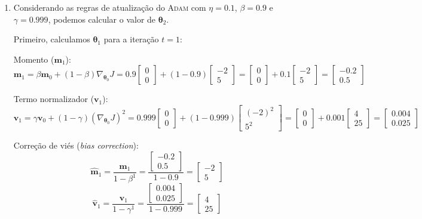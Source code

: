 \documentclass{dlproblemset}
\begin{document}
\begin{enumerate}[1)]
\begin{enumerate}
        \item {}
        Considerando as regras de atualização do \textsc{Adam} com $\eta = 0.1$, $\beta = 0.9$ e $\gamma = 0.999$, podemos calcular o valor de $\boldsymbol{\theta}_{2}$.

Primeiro, calculamos $\boldsymbol{\theta}_{1}$ para a iteração $t=1$:

  Momento ($\mathbf{m}_1$):
    $$\mathbf{m}_{1} = \beta \mathbf{m}_{0} + (1-\beta )\nabla_{\boldsymbol{\theta}_{0}}J = 0.9\begin{bmatrix} 0\\ 0 \end{bmatrix} + (1-0.9)\begin{bmatrix} -2\\ 5 \end{bmatrix} = \begin{bmatrix} 0\\ 0 \end{bmatrix} + 0.1\begin{bmatrix} -2\\ 5 \end{bmatrix} = \begin{bmatrix} -0.2\\ 0.5 \end{bmatrix}$$

  Termo normalizador ($\mathbf{v}_1$):
    $$\mathbf{v}_{1} = \gamma \mathbf{v}_{0} + (1-\gamma )(\nabla_{\boldsymbol{\theta}_{0}}J)^2 = 0.999\begin{bmatrix} 0\\ 0 \end{bmatrix} + (1-0.999)\begin{bmatrix} (-2)^2\\ 5^2 \end{bmatrix} = \begin{bmatrix} 0\\ 0 \end{bmatrix} + 0.001\begin{bmatrix} 4\\ 25 \end{bmatrix} = \begin{bmatrix} 0.004\\ 0.025 \end{bmatrix}$$

  Correção de viés (\textit{bias correction}):
    $$\hat{\mathbf{m}}_{1} = \frac{\mathbf{m}_{1}}{1 - \beta ^{1}} = \frac{\begin{bmatrix} -0.2\\ 0.5 \end{bmatrix}}{1 - 0.9} = \begin{bmatrix} -2\\ 5 \end{bmatrix}$$   $$\hat{\mathbf{v}}_{1} = \frac{\mathbf{v}_{1}}{1 - \gamma ^{1}} = \frac{\begin{bmatrix} 0.004\\ 0.025 \end{bmatrix}}{1 - 0.999} = \begin{bmatrix} 4\\ 25 \end{bmatrix}$$


\end{enumerate}
\end{enumerate}
\end{document}
